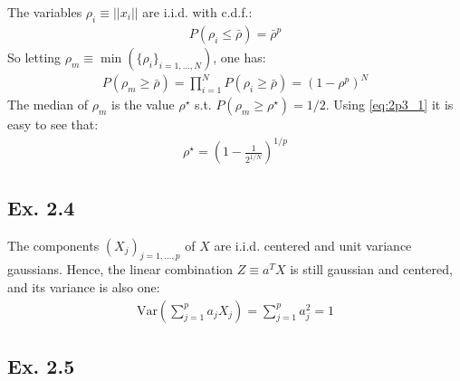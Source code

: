 The variables $\rho_i \equiv ||x_i||$ are i.i.d. with c.d.f.: 
\begin{eqnarray}
P(\rho_i \leq \bar{\rho}) = \bar{\rho}^p
\end{eqnarray}
So letting $\rho_m \equiv \min(\{\rho_i\}_{i=1,\ldots,N})$, one has:
\begin{eqnarray}\label{eq:2p3_1}
P\left(\rho_m \geq \bar{\rho}\right) = \prod_{i=1}^{N}P\left(\rho_i \geq 
\bar{\rho}\right) = \left(1 - \rho^p \right)^N
\end{eqnarray}
The median of $\rho_m$ is the value $\rho^\star$ s.t. $P\left(\rho_m \geq 
\rho^\star\right) = 1/2$. Using \eqref{eq:2p3_1} it is easy to see that:
\begin{eqnarray}
\rho^\star = \left(1 - \frac{1}{2^{1/N}} \right) ^{1/p}
\end{eqnarray}

\subsection*{Ex. 2.4}

The components $(X_j)_{j=1,\ldots,p}$ of $X$ are i.i.d. centered and unit variance 
gaussians. Hence, the linear combination $Z \equiv a^T X$ is still gaussian and 
centered, and its variance is also one:
\begin{eqnarray}
\textrm{Var}\left(\sum_{j=1}^p a_j X_j \right) = \sum_{j=1}^p a_j^2 = 1
\end{eqnarray}

\subsection*{Ex. 2.5}

